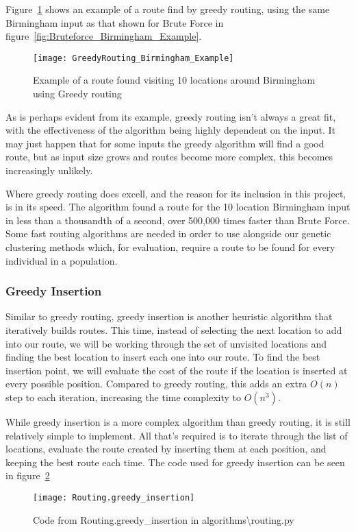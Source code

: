 \noindent
Figure~\ref{fig:GreedyRouting_Birmingham_Example} shows an example of a route find by greedy routing, using the same
Birmingham input as that shown for Brute Force in figure~\ref{fig:Bruteforce_Birmingham_Example}.
\begin{figure}[H]
    \centering
    \texttt{[image: GreedyRouting\_Birmingham\_Example]}
    \caption{Example of a route found visiting 10 locations around Birmingham using Greedy routing}
    \label{fig:GreedyRouting_Birmingham_Example}
\end{figure}

\noindent
As is perhaps evident from its example, greedy routing isn't always a great fit, with the effectiveness of the
algorithm being highly dependent on the input.
It may just happen that for some inputs the greedy algorithm will find a good route, but as input size grows and
routes become more complex, this becomes increasingly unlikely.

Where greedy routing does excell, and the reason for its inclusion in this project, is in its speed.
The algorithm found a route for the 10 location Birmingham input in less than a thousandth of a second, over 500,000
times faster than Brute Force.
Some fast routing algorithms are needed in order to use alongside our genetic clustering methods which, for
evaluation, require a route to be found for every individual in a population.

\subsubsection{Greedy Insertion}\label{subsubsec:greedy-insertion}
Similar to greedy routing, greedy insertion is another heuristic algorithm that iteratively builds routes.
This time, instead of selecting the next location to add into our route, we will be working through the set of
unvisited locations and finding the best location to insert each one into our route.
To find the best insertion point, we will evaluate the cost of the route if the location is inserted at every possible
position.
Compared to greedy routing, this adds an extra $O(n)$ step to each iteration, increasing the time complexity to
$O(n^3)$.

\noindent
While greedy insertion is a more complex algorithm than greedy routing, it is still relatively simple to implement.
All that's required is to iterate through the list of locations, evaluate the route created by inserting them at
each position, and keeping the best route each time.
The code used for greedy insertion can be seen in figure~\ref{fig:Routing.greedy_insertion}
\begin{figure}[H]
    \centering
    \texttt{[image: Routing.greedy\_insertion]}
    \caption{Code from Routing.greedy\_insertion in algorithms\textbackslash routing.py}
    \label{fig:Routing.greedy_insertion}
\end{figure}

